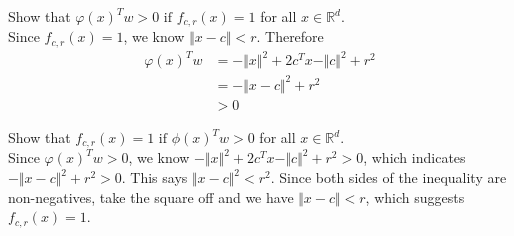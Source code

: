 \documentclass[11pt]{article}
\begin{document}
Show that $\varphi(x)^Tw>0 \text{ if } f_{c,r}(x)=1$ for all $x \in \mathbb{R}^d$. \\
Since $f_{c,r}(x)=1$, we know $\Vert x-c\Vert<r$. Therefore 
\begin{equation}
    \begin{split}
        \varphi(x)^Tw &=-\Vert x \Vert ^2+2c^Tx-\Vert c\Vert ^2+r^2\\
        &=-\Vert x-c \Vert^2+r^2 \\
        &>0
    \end{split}
\end{equation}


Show that $f_{c,r}(x)=1 \text{ if } \phi(x)^Tw>0$ for all $x \in \mathbb{R}^d$. \\
Since $\varphi(x)^Tw>0$, we know $-\Vert x \Vert ^2+2c^Tx-\Vert c\Vert ^2+r^2>0$, which indicates $-\Vert x-c \Vert^2+r^2>0$. This says $\Vert x-c \Vert^2<r^2$. Since both sides of the inequality are non-negatives, take the square off and we have $\Vert x-c \Vert<r$, which suggests $f_{c,r}(x)=1$.
\end{document}
